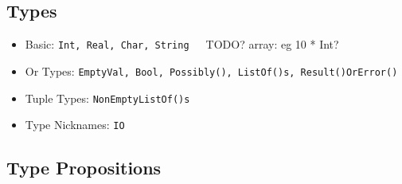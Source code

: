 \documentclass{article}
\begin{document}
\subsection{Types}

\begin{itemize}
\item Basic: \texttt{Int, Real, Char, String}\ \ \ TODO? array: eg 10 * Int?
\item Or Types: \texttt{EmptyVal, Bool, Possibly(), ListOf()s, Result()OrError()}
\item Tuple Types: \texttt{NonEmptyListOf()s}
\item Type Nicknames: \texttt{IO}
\end{itemize}

\subsection{Type Propositions}
\end{document}
